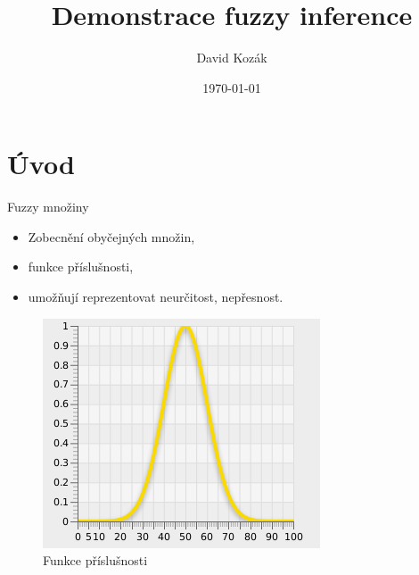 \documentclass{beamer}
\title[Fuzzy inference]{Demonstrace fuzzy inference}
\author{David Kozák}
\institute{FIT VUT}
\date{\today}
\begin{document}
\begin{frame}
  \titlepage
\end{frame}

\section{Úvod}

\begin{frame}{Fuzzy množiny}

\begin{itemize}
  \item Zobecnění obyčejných množin,
  \item funkce příslušnosti,
  \item umožňují reprezentovat neurčitost, nepřesnost.
\end{itemize}

	\begin{figure}[h]
		\centering
		\includegraphics[scale=0.4]{membershipFunction}
		\caption{Funkce příslušnosti}
	\end{figure}


\end{frame}
\end{document}
